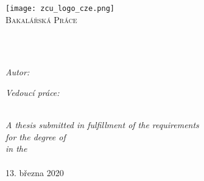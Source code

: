 \frontmatter %

\pagestyle{plain} %


\begin{titlepage}
\begin{center}
\texttt{[image: zcu\_logo\_cze.png]} %
\\\vspace{3cm}
\textsc{\Large Bakalářská Práce}\\[0.2cm] 	 %

\HRule \\[0.4cm] %
{\huge \bfseries \ttitle\par}\vspace{0.4cm} %
\HRule \\[1.5cm] %
 
\begin{minipage}[t]{0.45\textwidth}
\begin{flushleft} \large
\emph{Autor:}\\{\authorname}
\end{flushleft}
\end{minipage}
\begin{minipage}[t]{0.45\textwidth}
\begin{flushright} \large
\emph{Vedoucí práce:} \\
\href{http://www.kky.zcu.cz/cs/people/bulin-martin}{\supname}
\end{flushright}
\end{minipage}\\[2.5cm]
 
\large \textit{A thesis submitted in fulfillment of the requirements\\ for the degree of \degreename}\\[0.3cm] %
\textit{in the}\\[0.4cm]
\deptname %
 \\\vspace{2cm}
{\large 13. března 2020} 
 
\vfill
\end{center}
\end{titlepage}